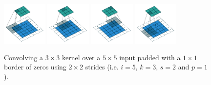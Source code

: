 \documentclass{article}
\begin{document}
\begin{figure}[t]
    \centering
    \includegraphics[width=0.2\textwidth]{pdf/padding_strides_00.pdf}
    \includegraphics[width=0.2\textwidth]{pdf/padding_strides_01.pdf}
    \includegraphics[width=0.2\textwidth]{pdf/padding_strides_02.pdf}
    \includegraphics[width=0.2\textwidth]{pdf/padding_strides_03.pdf}
    \caption{\label{fig:padding_strides} Convolving a $3 \times 3$ kernel over a
        $5 \times 5$ input padded with a $1 \times 1$ border of zeros using $2
        \times 2$ strides (i.e.  $i = 5$, $k = 3$, $s = 2$ and $p = 1$).}
\end{figure}
\end{document}
